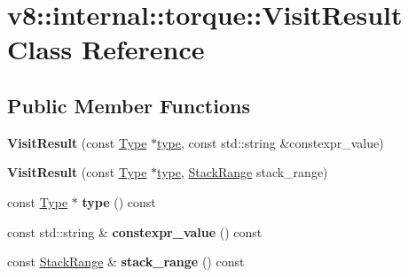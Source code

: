 \hypertarget{classv8_1_1internal_1_1torque_1_1VisitResult}{}\section{v8\+:\+:internal\+:\+:torque\+:\+:Visit\+Result Class Reference}
\label{classv8_1_1internal_1_1torque_1_1VisitResult}
\subsection*{Public Member Functions}
\begin{DoxyCompactItemize}
\item 
\mbox{\label{classv8_1_1internal_1_1torque_1_1VisitResult_a5ea881d720eb762ab17f5d71ebb6e9d9}} 
{\bfseries Visit\+Result} (const \mbox{\hyperlink{classv8_1_1internal_1_1torque_1_1Type}{Type}} $\ast$\mbox{\hyperlink{classstd_1_1conditional_1_1type}{type}}, const std\+::string \&constexpr\+\_\+value)
\item 
\mbox{\label{classv8_1_1internal_1_1torque_1_1VisitResult_a95f44eb7d6812ce0ff764f6c58234db8}} 
{\bfseries Visit\+Result} (const \mbox{\hyperlink{classv8_1_1internal_1_1torque_1_1Type}{Type}} $\ast$\mbox{\hyperlink{classstd_1_1conditional_1_1type}{type}}, \mbox{\hyperlink{classv8_1_1internal_1_1torque_1_1StackRange}{Stack\+Range}} stack\+\_\+range)
\item 
\mbox{\label{classv8_1_1internal_1_1torque_1_1VisitResult_a3ecd6a70210af760da9fef4af77bbd51}} 
const \mbox{\hyperlink{classv8_1_1internal_1_1torque_1_1Type}{Type}} $\ast$ {\bfseries type} () const
\item 
\mbox{\label{classv8_1_1internal_1_1torque_1_1VisitResult_adbea8abb4a331751df407b0025c683db}} 
const std\+::string \& {\bfseries constexpr\+\_\+value} () const
\item 
\mbox{\label{classv8_1_1internal_1_1torque_1_1VisitResult_a2f3878af27a21854fde81c8fd436268a}} 
const \mbox{\hyperlink{classv8_1_1internal_1_1torque_1_1StackRange}{Stack\+Range}} \& {\bfseries stack\+\_\+range} () const

\end{DoxyCompactItemize}
